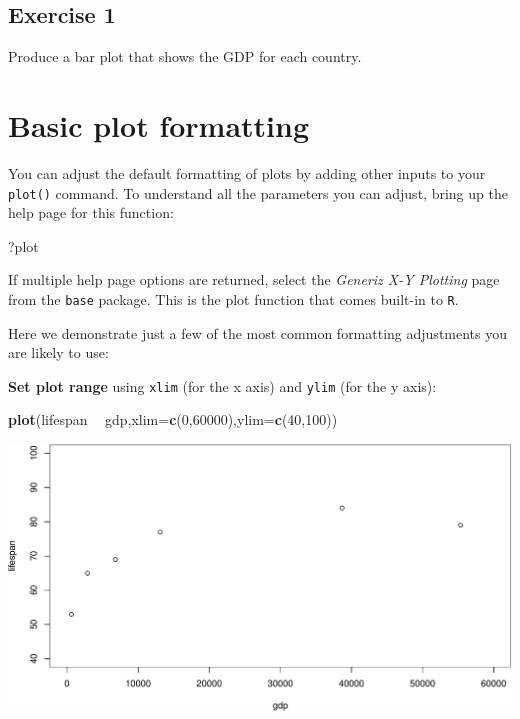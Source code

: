 \documentclass[
]{book}
\newenvironment{Shaded}{\begin{snugshade}}{\end{snugshade}}
\newcommand{\DataTypeTok}[1]{\textcolor[rgb]{0.13,0.29,0.53}{#1}}
\newcommand{\DecValTok}[1]{\textcolor[rgb]{0.00,0.00,0.81}{#1}}
\newcommand{\KeywordTok}[1]{\textcolor[rgb]{0.13,0.29,0.53}{\textbf{#1}}}
\newcommand{\NormalTok}[1]{#1}
\newcommand{\OperatorTok}[1]{\textcolor[rgb]{0.81,0.36,0.00}{\textbf{#1}}}
\newcommand{\StringTok}[1]{\textcolor[rgb]{0.31,0.60,0.02}{#1}}
\begin{document}
\hypertarget{exercise-1-4}{%
\subsection*{Exercise 1}\label{exercise-1-4}}

Produce a bar plot that shows the GDP for each country.

\hypertarget{basic-plot-formatting}{%
\section*{Basic plot formatting}\label{basic-plot-formatting}}

You can adjust the default formatting of plots by adding other inputs to your \texttt{plot()} command. To understand all the parameters you can adjust, bring up the help page for this function:

\begin{Shaded}
\begin{Highlighting}[]
\NormalTok{?plot}
\end{Highlighting}
\end{Shaded}

If multiple help page options are returned, select the \emph{Generiz X-Y Plotting} page from the \texttt{base} package. This is the plot function that comes built-in to \texttt{R}.

Here we demonstrate just a few of the most common formatting adjustments you are likely to use:

\textbf{Set plot range} using \texttt{xlim} (for the x axis) and \texttt{ylim} (for the y axis):

\begin{Shaded}
\begin{Highlighting}[]
\KeywordTok{plot}\NormalTok{(lifespan }\OperatorTok{~}\StringTok{ }\NormalTok{gdp,}\DataTypeTok{xlim=}\KeywordTok{c}\NormalTok{(}\DecValTok{0}\NormalTok{,}\DecValTok{60000}\NormalTok{),}\DataTypeTok{ylim=}\KeywordTok{c}\NormalTok{(}\DecValTok{40}\NormalTok{,}\DecValTok{100}\NormalTok{))}
\end{Highlighting}
\end{Shaded}

\includegraphics{figures/unnamed-chunk-101-1.pdf}
\end{document}
